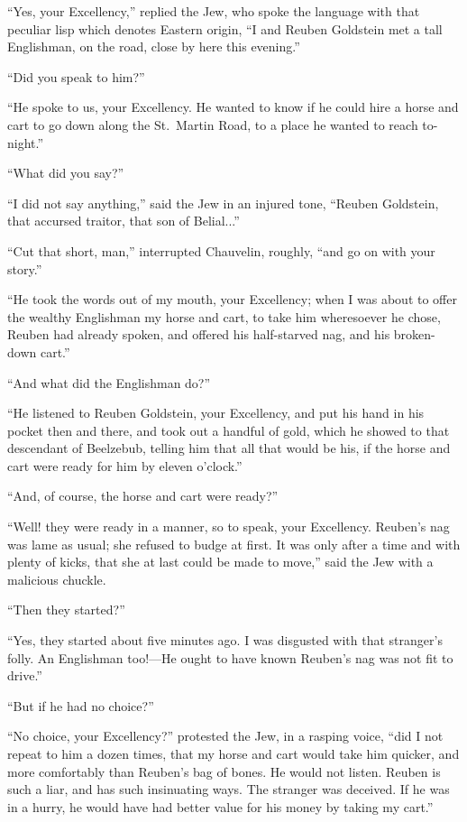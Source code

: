 \documentclass[paper=5.5in:8.5in,BCOR=7mm,twoside,DIV=calc,12pt,usegeometry,chapterprefix,endperiod,headings=big]{scrbook}
\begin{document}
\enquote{Yes, your Excellency,} replied the Jew, who spoke the language with that peculiar lisp which denotes Eastern origin, \enquote{I and Reuben Goldstein met a tall Englishman, on the road, close by here this evening.}

\enquote{Did you speak to him?}

\enquote{He spoke to us, your Excellency. He wanted to know if he could hire a horse and cart to go down along the St.~Martin Road, to a place he wanted to reach to-night.}

\enquote{What did you say?}

\enquote{I did not say anything,} said the Jew in an injured tone, \enquote{Reuben Goldstein, that accursed traitor, that son of Belial...}

\enquote{Cut that short, man,} interrupted Chauvelin, roughly, \enquote{and go on with your story.}

\enquote{He took the words out of my mouth, your Excellency; when I was about to offer the wealthy Englishman my horse and cart, to take him wheresoever he chose, Reuben had already spoken, and offered his half-starved nag, and his broken-down cart.}

\enquote{And what did the Englishman do?}

\enquote{He listened to Reuben Goldstein, your Excellency, and put his hand in his pocket then and there, and took out a handful of gold, which he showed to that descendant of Beelzebub, telling him that all that would be his, if the horse and cart were ready for him by eleven o'clock.}

\enquote{And, of course, the horse and cart were ready?}

\enquote{Well! they were ready in a manner, so to speak, your Excellency. Reuben's nag was lame as usual; she refused to budge at first. It was only after a time and with plenty of kicks, that she at last could be made to move,} said the Jew with a malicious chuckle.

\enquote{Then they started?}

\enquote{Yes, they started about five minutes ago. I was disgusted with that stranger's folly. An Englishman too!---He ought to have known Reuben's nag was not fit to drive.}

\enquote{But if he had no choice?}

\enquote{No choice, your Excellency?} protested the Jew, in a rasping voice, \enquote{did I not repeat to him a dozen times, that my horse and cart would take him quicker, and more comfortably than Reuben's bag of bones. He would not listen. Reuben is such a liar, and has such insinuating ways. The stranger was deceived. If he was in a hurry, he would have had better value for his money by taking my cart.}
\end{document}
